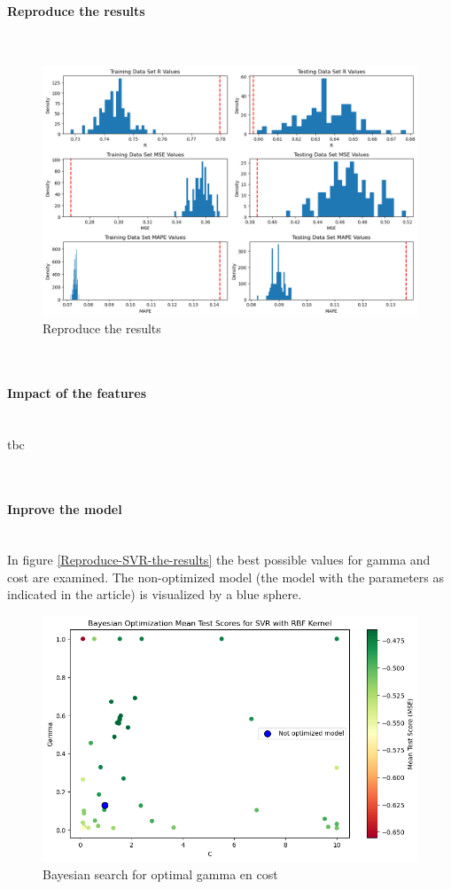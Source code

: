 \documentclass{article}
\newcommand{\subsubsubsection}[1]{%
  \paragraph{#1}\mbox{}\\}
\begin{document}
\subsubsubsection{Reproduce the results}
\begin{figure}
\centering
\includegraphics[width=\linewidth]{figures/SVR_reproduce_the_results.png}
\caption{Reproduce the results}
\label{fig:Reproduce-SVR-the-results}
\end{figure}

\subsubsubsection{Impact of the features}
tbc


\subsubsubsection{Inprove the model}

In figure \ref{Reproduce-SVR-the-results} the best possible values for gamma and cost are examined. The non-optimized model (the model with the parameters as indicated in the article) is visualized by a blue sphere.
\begin{figure}
    \centering
    \includegraphics[width=\linewidth]{figures/bayesian_optimization.png}
    \caption{Bayesian search for optimal gamma en cost}
    \label{fig:optimized-model}
\end{figure}
\end{document}
